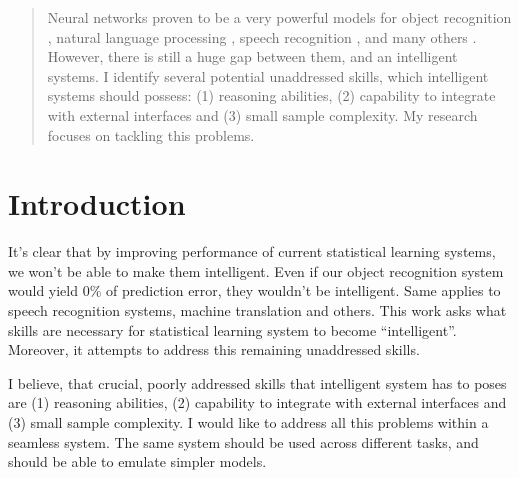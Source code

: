 \documentclass{article}
\begin{document}
 


\begin{abstract}

Neural networks proven to be a very powerful models for object recognition \cite{krizhevsky2012imagenet}, 
natural language processing \cite{mikolov2012statistical}, speech recognition \cite{graves2013speech}, and many others \cite{sutskever2014sequence}. 
However, there is still a huge gap between them, and an intelligent systems. 
I identify several potential unaddressed skills, which intelligent systems should possess: 
(1) reasoning abilities, (2) capability to integrate with external interfaces and (3) small sample complexity. My research focuses on tackling this problems. 

\end{abstract} 

\section{Introduction}
It's clear that by improving performance of current statistical learning systems, 
we won't be able to make them intelligent. Even if our object recognition system would yield
$0\%$ of prediction error, they wouldn't be intelligent. Same applies to speech 
recognition systems, machine translation and others. This work asks what skills are necessary for statistical
learning system to become ``intelligent''. Moreover, it attempts to address this remaining unaddressed skills. 


I believe, that crucial, poorly addressed skills that intelligent system has to poses are
(1) reasoning abilities, (2) capability to integrate with external interfaces and (3) small sample complexity. 
I would like to address all this problems within a seamless system. The same system should be used across
different tasks, and should be able to emulate simpler models. 
\end{document}
